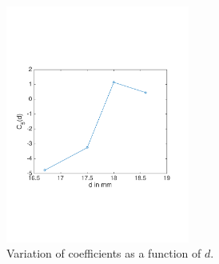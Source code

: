 \documentclass[10pt]{article}
\begin{document}
\begin{figure}[h]
\includegraphics[width=2.37in]{variationC_5}
\caption{Variation of coefficients as a function of $d$.}
\label{fig:coeff1}
\end{figure}
\end{document}
